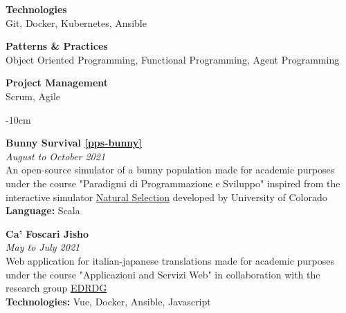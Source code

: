 \documentclass[10pt,a4paper]{altacv}
\begin{document}
    \divider

    \textbf{Technologies} \\ \smallskip
    Git, Docker, Kubernetes, Ansible

    \divider

    \textbf{Patterns \& Practices} \\ \smallskip
    Object Oriented Programming, Functional Programming, Agent Programming

    \divider

    \textbf{Project Management} \\ \smallskip
    Scrum, Agile

    \divider

    \clearpage

\begin{adjustwidth}{}{-10cm}

    \textbf{Bunny Survival \href{https://github.com/anitvam/pps-bunny}{[pps-bunny]}}\\
    \textit{August to October 2021}\\ \smallskip
    An open-source simulator of a bunny population made for academic purposes under the course "Paradigmi di Programmazione e Sviluppo" inspired from the interactive simulator \href{https://phet.colorado.edu/en/simulations/natural-selection}{\underline{Natural Selection}} developed by University of Colorado\\ \smallskip
    \textbf{Language:} Scala

    \divider


    \textbf{\textbf{Ca' Foscari Jisho}}\\
    \textit{May to July 2021} \\ \smallskip
    Web application for italian-japanese translations made for academic purposes under the course "Applicazioni and Servizi Web" in collaboration with the research group \href{http://www.edrdg.org}{\underline{EDRDG}}\\ \smallskip
    \textbf{Technologies:} Vue, Docker, Ansible, Javascript

    \divider
\end{adjustwidth}
\end{document}
